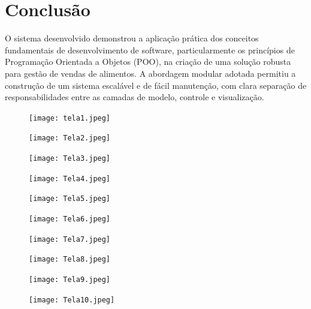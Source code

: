 \documentclass[conference]{IEEEtran}
\begin{document}
\section{Conclusão}

O sistema desenvolvido demonstrou a aplicação prática dos conceitos fundamentais de desenvolvimento de software, particularmente os princípios de Programação Orientada a Objetos (POO), na criação de uma solução robusta para gestão de vendas de alimentos. A abordagem modular adotada permitiu a construção de um sistema escalável e de fácil manutenção, com clara separação de responsabilidades entre as camadas de modelo, controle e visualização.
\begin{figure}
    \centering
    \texttt{[image: tela1.jpeg]}
    \caption{}
    \label{fig:enter-label}
\end{figure}

\begin{figure}
    \centering
    \texttt{[image: Tela2.jpeg]}
    \caption{}
    \label{fig:enter-label}
\end{figure}
\begin{figure}
    \centering
    \texttt{[image: Tela3.jpeg]}
    \caption{}
    \label{fig:enter-label}
\end{figure}
\begin{figure}
    \centering
    \texttt{[image: Tela4.jpeg]}
    \caption{}
    \label{fig:enter-label}
\end{figure}
\begin{figure}
    \centering
    \texttt{[image: Tela5.jpeg]}
    \caption{}
    \label{fig:enter-label}
\end{figure}
\begin{figure}
    \centering
    \texttt{[image: Tela6.jpeg]}
    \caption{}
    \label{fig:enter-label}
\end{figure}
\begin{figure}
    \centering
    \texttt{[image: Tela7.jpeg]}
    \caption{}
    \label{fig:enter-label}
\end{figure}
\begin{figure}
    \centering
    \texttt{[image: Tela8.jpeg]}
    \caption{}
    \label{fig:enter-label}
\end{figure}
\begin{figure}
    \centering
    \texttt{[image: Tela9.jpeg]}
    \caption{}
    \label{fig:enter-label}
\end{figure}
\begin{figure}
    \centering
    \texttt{[image: Tela10.jpeg]}
    \caption{}
    \label{fig:enter-label}
\end{figure}
\end{document}
